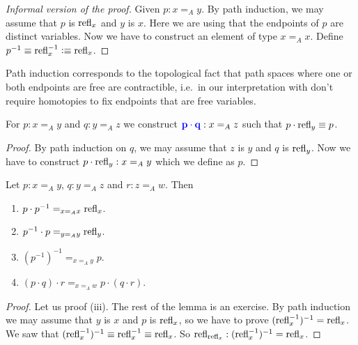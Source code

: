 \begin{proof}[Informal version of the proof]
    Given $p : x \mathrel{=_A} y$. 
    By path induction, we may assume that $p$ is $\operatorname{refl}_{x}$ and $y$ is $x$. 
    Here we are using that the endpoints of $p$ are distinct variables. 
    Now we have to construct an element of type $x \mathrel{=_A} x$. 
    Define $p^{-1} \equiv \operatorname{refl}_{x}^{-1} \vcentcolon\equiv \operatorname{refl}_{x}$. 
\end{proof}

\begin{rem}
    Path induction corresponds to the topological fact that path spaces where one or both endpoints are free are contractible, i.e.\ in our interpretation with don't require homotopies to fix endpoints that are free variables.
\end{rem}

\begin{boxlem}
    For $p : x \mathrel{=_A} y$ and $q : y \mathrel{=_A} z$ we construct $\alert{p \cdot q} : x \mathrel{=_A} z$ such that $p \cdot\operatorname{refl}_{y} \equiv p$.
\end{boxlem}

\begin{proof}
    By path induction on $q$, we may assume that $z$ is $y$ and $q$ is $\operatorname{refl}_{y}$. 
    Now we have to construct $p \cdot\operatorname{refl}_{y} : x \mathrel{=_A} y$ which we define as $p$. 
\end{proof}

\begin{boxlem}\label{lem:paths}
    Let $p : x \mathrel{=_A} y$, $q : y \mathrel{=_A} z$ and $r : z \mathrel{=_A} w$. 
    Then
    \begin{enumerate}
        \item $p \cdot p^{-1} \mathrel{=_{x \mathrel{=_A} x}} \operatorname{refl}_{x}$.
        \item $p^{-1} \cdot p \mathrel{=_{y \mathrel{=_A} y}} \operatorname{refl}_{y}$.
        \item $(p^{-1})^{-1} \mathrel{=_{x \mathrel{=_A} y}} p$.
        \item $(p \cdot q) \cdot r \mathrel{=_{x \mathrel{=_A} w}} p\cdot (q \cdot r)$.
    \end{enumerate}
\end{boxlem}

\begin{proof}
    Let us proof (iii). 
    The rest of the lemma is an exercise. 
    By path induction we may assume that $y$ is $x$ and $p$ is $\operatorname{refl}_{x}$, so we have to prove $(\operatorname{refl}_{x}^{-1})^{-1} = \operatorname{refl}_{x}$. 
    We saw that $(\operatorname{refl}_{x}^{-1})^{-1} \equiv \operatorname{refl}_{x}^{-1} \equiv \operatorname{refl}_{x}$.
    So $\operatorname{refl}_{\operatorname{refl}_{x}} : (\operatorname{refl}_{x}^{-1})^{-1} = \operatorname{refl}_{x}$.
\end{proof}

